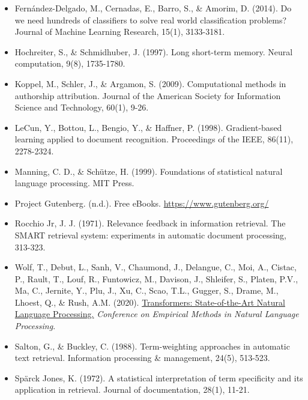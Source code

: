 \documentclass[
]{article}
\begin{document}
\begin{itemize}
\item
  Fernández-Delgado, M., Cernadas, E., Barro, S., \& Amorim, D. (2014).
  Do we need hundreds of classifiers to solve real world classification
  problems? Journal of Machine Learning Research, 15(1), 3133-3181.
\item
  Hochreiter, S., \& Schmidhuber, J. (1997). Long short-term memory.
  Neural computation, 9(8), 1735-1780.
\item
  Koppel, M., Schler, J., \& Argamon, S. (2009). Computational methods
  in authorship attribution. Journal of the American Society for
  Information Science and Technology, 60(1), 9-26.
\item
  LeCun, Y., Bottou, L., Bengio, Y., \& Haffner, P. (1998).
  Gradient-based learning applied to document recognition. Proceedings
  of the IEEE, 86(11), 2278-2324.
\item
  Manning, C. D., \& Schütze, H. (1999). Foundations of statistical
  natural language processing. MIT Press.
\item
  Project Gutenberg. (n.d.). Free eBooks.
  \url{https://www.gutenberg.org/}
\item
  Rocchio Jr, J. J. (1971). Relevance feedback in information retrieval.
  The SMART retrieval system: experiments in automatic document
  processing, 313-323.
\item
  Wolf, T., Debut, L., Sanh, V., Chaumond, J., Delangue, C., Moi, A.,
  Cistac, P., Rault, T., Louf, R., Funtowicz, M., Davison, J., Shleifer,
  S., Platen, P.V., Ma, C., Jernite, Y., Plu, J., Xu, C., Scao, T.L.,
  Gugger, S., Drame, M., Lhoest, Q., \& Rush, A.M. (2020).
  \href{https://aclanthology.org/2020.emnlp-demos.6/}{Transformers:
  State-of-the-Art Natural Language Processing.} \emph{Conference on
  Empirical Methods in Natural Language Processing}.
\item
  Salton, G., \& Buckley, C. (1988). Term-weighting approaches in
  automatic text retrieval. Information processing \& management, 24(5),
  513-523.
\item
  Spärck Jones, K. (1972). A statistical interpretation of term
  specificity and its application in retrieval. Journal of
  documentation, 28(1), 11-21.
\end{itemize}
\end{document}
